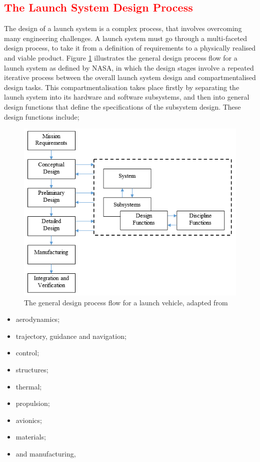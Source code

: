   
  
  
  
  

   
   
   
  
  \textcolor{red}{
  \section{The Launch System Design Process}
}

The design of a launch system is a complex process, that involves overcoming many engineering challenges. A launch system must go through a multi-faceted design process, to take it from a definition of requirements to a physically realised and viable product. Figure \ref{fig:DesignFlow} illustrates the general design process flow for a launch system as defined by NASA\cite{Blair2001}, in which the design stages involve a repeated iterative process between the overall launch system design and compartmentalised design tasks. This compartmentalisation takes place firstly by separating the
launch system into its hardware and software subsystems, and then into general design functions that define the specifications of the subsystem design. These design functions include;
\begin{figure}[ht]
	\centering
	\includegraphics[width=0.7\linewidth]{figures/2_literature-review/DesignFlow}
	\caption{The general design process flow for a launch vehicle, adapted from \cite{Blair2001}}
	\label{fig:DesignFlow}
\end{figure}
\begin{itemize}
	\setlength\itemsep{.2em}
\item aerodynamics;
\item trajectory, guidance and navigation;
\item control;
\item structures;
\item thermal;
\item propulsion;
\item avionics;
\item materials;
\item and manufacturing,
\end{itemize}
